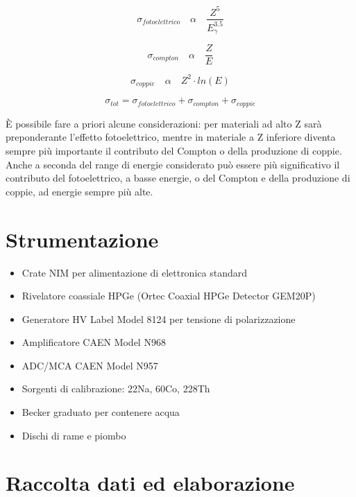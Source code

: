 \documentclass[a4paper,10pt]{article}
\begin{document}
\begin{equation}
	\sigma_{fotoelettrico}\quad  \alpha \quad  \frac{Z^5}{E_{\gamma}^{3.5}}
\end{equation}

\begin{equation}
	\sigma_{compton}\quad  \alpha \quad  \frac{Z}{E}
\end{equation}

\begin{equation}
	\sigma_{coppie}\quad  \alpha \quad  Z^2 \cdot ln(E)
\end{equation}

\begin{equation}
	\sigma_{tot} = \sigma_{fotoelettrico} + \sigma_{compton} + \sigma_{coppie}
\end{equation}

\noindent \`E possibile fare a priori alcune considerazioni: per materiali ad alto Z sar\`a preponderante l'effetto fotoelettrico, mentre in materiale a Z inferiore diventa sempre pi\`u importante il contributo del Compton o della produzione di coppie. Anche a seconda del range di energie considerato pu\`o essere pi\`u significativo il contributo del fotoelettrico, a basse energie, o del Compton e della produzione di coppie, ad energie sempre pi\`u alte.


\section{Strumentazione}
\begin{itemize}
\item Crate NIM per alimentazione di elettronica standard
\item Rivelatore coassiale HPGe (Ortec Coaxial HPGe Detector GEM20P)
\item Generatore HV Label Model 8124 per tensione di polarizzazione
\item Amplificatore CAEN Model N968
\item ADC/MCA CAEN Model N957
\item Sorgenti di calibrazione: 22Na, 60Co, 228Th
\item Becker graduato per contenere acqua
\item Dischi di rame e piombo
\end{itemize}


\section{Raccolta dati ed elaborazione}
\end{document}
